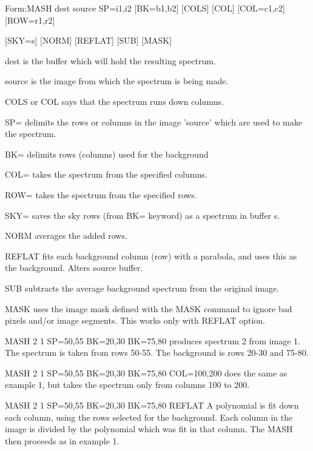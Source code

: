 {\newpage\clearpage
{}%
\begin{command}
  \item[Form:MASH dest source SP=i1,i2 {[BK=b1,b2]} {[COLS]} {[COL]} 
       {[COL=c1,c2]} {[ROW=r1,r2]}\hfill]{}
  \item{{[SKY=s]} {[NORM]} {[REFLAT]} {[SUB]} {[MASK]}}
  \item[dest\hfill]{is the buffer which will hold the resulting spectrum.}
  \item[source\hfill]{is the image from which the spectrum is being made.}
  \item[COLS or COL\hfill]{says that the spectrum runs down columns.}
  \item[SP=\hfill]{delimits the rows or columns in the image 
        'source' which are used to make the spectrum.}
  \item[BK=\hfill]{delimits rows (columns) used for the background}
  \item[COL=\hfill]{takes the spectrum from the specified columns.}
  \item[ROW=\hfill]{takes the spectrum from the specified rows.}
  \item[SKY=\hfill]{saves the sky rows (from BK= keyword) as a
        spectrum in buffer s.}
  \item[NORM\hfill]{averages the added rows.}
  \item[REFLAT\hfill]{fits each background column (row) with a parabola, 
        and uses this as the background.  Alters source buffer.}
  \item[SUB\hfill]{subtracts the average background spectrum from
        the original image.}
  \item[MASK\hfill]{uses the image mask defined with the MASK
       command to ignore bad pixels and/or image}
       segments.  This works only with REFLAT option.
\end{command}%
\lthtmlfigureZ
\lthtmlcheckvsize\clearpage}

{\newpage\clearpage
{}%
\begin{example}
  \item[MASH 2 1 SP=50,55 BK=20,30 BK=75,80\hfill]{ produces spectrum 2
       from image 1.  The spectrum is taken from rows 50-55.  The
       background is rows 20-30 and 75-80.}
\par
\item[MASH 2 1 SP=50,55 BK=20,30 BK=75,80 COL=100,200\hfill]{ does the
       same as example 1, but takes the spectrum only from columns 100 to
       200.}
\par
\item[MASH 2 1 SP=50,55 BK=20,30 BK=75,80 REFLAT\hfill]{ A polynomial is
       fit down each column, using the rows selected for the background.
       Each column in the image is divided by the polynomial which was fit
       in that column.  The MASH then proceeds as in example 1.}
\end{example}%
\lthtmlfigureZ
\lthtmlcheckvsize\clearpage}

